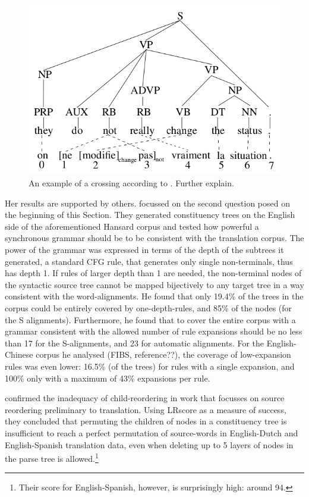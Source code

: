 \documentclass{report}
\theoremstyle{break}
\begin{document}
\begin{figure}[!ht]
\centering
\includegraphics[scale=0.4]{crossing.png}
\caption{An example of a crossing according to \cite{fox2002phrasal}. Further explain.}\label{fig:fox}
\end{figure}

Her results are supported by others. \cite{galley2004s} focussed on the second question posed on the beginning of this Section. They generated constituency trees on the English side of the aforementioned Hansard corpus and tested how powerful a synchronous grammar should be to be consistent with the translation corpus. The power of the grammar was expressed in terms of the depth of the subtrees it generated, a standard CFG rule, that generates only single non-terminals, thus has depth 1. If rules of larger depth than 1 are needed, the non-terminal nodes of the syntactic source tree cannot be mapped bijectively to any target tree in a way consistent with the word-alignments. He found that only 19.4\% of the trees in the corpus could be entirely covered by one-depth-rules, and 85\% of the nodes (for the S alignments). Furthermore, he found that to cover the entire corpus with a grammar consistent with the allowed number of rule expansions should be no less than 17 for the S-alignments, and 23 for automatic alignments. For the English-Chinese corpus he analysed (FIBS, reference??), the coverage of low-expansion rules was even lower: 16.5\% (of the trees) for rules with a single expansion, and 100\% only with a maximum of 43\% expansions per rule.

\cite{khalilov2012statistical} confirmed the inadequacy of child-reordering in work that focusses on source reordering preliminary to translation. Using LRscore \citep{birch2010lrscore} as a measure of success, they concluded that permuting the children of nodes in a constituency tree is insufficient to reach a perfect permutation of source-words in English-Dutch and English-Spanish translation data, even when deleting up to 5 layers of nodes in the parse tree is allowed.\footnote{Their score for English-Spanish, however, is surprisingly high: around 94.}
\end{document}
